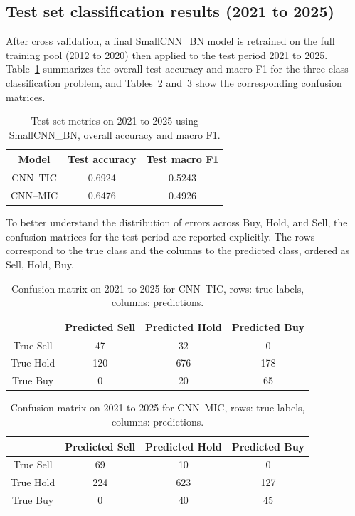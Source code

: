 \documentclass[12pt,a4paper]{article}
\begin{document}
\subsection{Test set classification results (2021 to 2025)}

After cross validation, a final SmallCNN\_BN model is retrained on the full training pool (2012 to 2020) then applied to the test period 2021 to 2025. Table~\ref{tab:test-metrics-smallcnn-bn} summarizes the overall test accuracy and macro F1 for the three class classification problem, and Tables~\ref{tab:cm-tech-only} and~\ref{tab:cm-tech-macro} show the corresponding confusion matrices.

\begin{table}[H]
	\centering
	\caption{Test set metrics on 2021 to 2025 using SmallCNN\_BN, overall accuracy and macro F1.}
	\label{tab:test-metrics-smallcnn-bn}
	\small
	\begin{tabular}{|c|c|c|}
		\hline
		Model & Test accuracy & Test macro F1 \\
		\hline
		CNN--TIC & 0.6924 & 0.5243 \\
		\hline
		CNN--MIC & 0.6476 & 0.4926 \\
		\hline
	\end{tabular}
\end{table}


 To better understand the distribution of errors across Buy, Hold, and Sell, the confusion matrices for the test period are reported explicitly. The rows correspond to the true class and the columns to the predicted class, ordered as Sell, Hold, Buy.

\begin{table}[H]
	\centering
	\caption{Confusion matrix on 2021 to 2025 for CNN--TIC, rows: true labels, columns: predictions.}
	\label{tab:cm-tech-only}
	\small
	\begin{tabular}{|c|c|c|c|}
		\hline
		& Predicted Sell & Predicted Hold & Predicted Buy \\
		\hline
		True Sell & 47 & 32 & 0 \\
		\hline
		True Hold & 120 & 676 & 178 \\
		\hline
		True Buy & 0 & 20 & 65 \\
		\hline
	\end{tabular}
\end{table}


\begin{table}[H]
	\centering
	\caption{Confusion matrix on 2021 to 2025 for CNN--MIC, rows: true labels, columns: predictions.}
	\label{tab:cm-tech-macro}
	\small
	\begin{tabular}{|c|c|c|c|}
		\hline
		& Predicted Sell & Predicted Hold & Predicted Buy \\
		\hline
		True Sell & 69 & 10 & 0 \\
		\hline
		True Hold & 224 & 623 & 127 \\
		\hline
		True Buy & 0 & 40 & 45 \\
		\hline
	\end{tabular}
\end{table}
\end{document}
